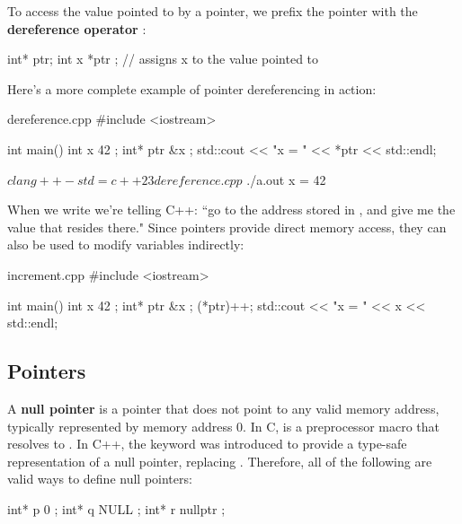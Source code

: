 \documentclass[12pt]{article}
\begin{document}
\noindent
To access the value pointed to by a pointer, we prefix the pointer with the \textbf{dereference operator} \inlinecxx{*}:

\begin{cxx}{}
int* ptr;
int x { *ptr }; // assigns x to the value pointed to
\end{cxx}

\noindent
Here's a more complete example of pointer dereferencing in action:

\begin{cxx}{dereference.cpp}
#include <iostream>

int main()
{
	int x { 42 };
	int* ptr { &x };
	std::cout << "x = " << *ptr << std::endl;
}
\end{cxx}

\begin{terminal}
$ clang++ -std=c++23 dereference.cpp
$ ./a.out
x = 42
\end{terminal}

\noindent
When we write  we're telling C++: ``go to the address stored in , and give me the value that resides there."
Since pointers provide direct memory access, they can also be used to modify variables indirectly:

\begin{cxx}{increment.cpp}
#include <iostream>

int main()
{
	int x { 42 };
	int* ptr { &x };
	(*ptr)++;
	std::cout << "x = " << x << std::endl;
}
\end{cxx}


\subsection{ Pointers}

\noindent
A \textbf{null pointer} is a pointer that does not point to any valid memory address, typically represented by memory address 0.
In C,  is a preprocessor macro that resolves to .
In C++, the  keyword was introduced to provide a type-safe representation of a null pointer, replacing .
Therefore, all of the following are valid ways to define null pointers:

\begin{cxx}{}
int* p { 0 };
int* q { NULL };
int* r { nullptr };
\end{cxx}
\end{document}
